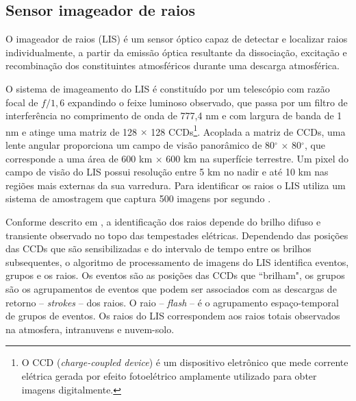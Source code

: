 \subsection{Sensor imageador de raios}

O imageador de raios (LIS) é um sensor óptico capaz de detectar e localizar raios individualmente, a partir da emissão óptica resultante da dissociação, excitação e recombinação dos constituintes atmosféricos durante uma descarga atmosférica. 

O sistema de imageamento do LIS é constituído por um telescópio com razão focal de $f/1,6$ expandindo o feixe luminoso observado, que passa por um filtro de interferência no comprimento de onda de 777,4 nm e com largura de banda de 1 nm e atinge uma matriz de 128 $\times$ 128 CCDs\footnote{O CCD (\textit{charge-coupled device}) é um dispositivo eletrônico que mede corrente elétrica gerada por efeito fotoelétrico amplamente utilizado para obter imagens digitalmente.}. Acoplada a matriz de CCDs, uma lente angular proporciona um campo de visão panorâmico de 80$^{\circ}$ $\times$ 80$^{\circ}$, que corresponde a uma área de 600 km $\times$ 600 km na superfície terrestre. Um pixel do campo de visão do LIS possui resolução entre 5 km no nadir e até 10 km nas regiões mais externas da sua varredura. Para identificar os raios o LIS utiliza um sistema de amostragem que captura 500 imagens por segundo \cite{christian2000LISalgorithm,boccippio1996science,trmmhandbook}. 


Conforme descrito em , a identificação dos raios depende do brilho difuso e transiente observado no topo das tempestades elétricas. Dependendo das posições das CCDs que são sensibilizadas e do intervalo de tempo entre os brilhos subsequentes, o algoritmo de processamento de imagens do LIS identifica  eventos, grupos e os raios. Os eventos são as posições das CCDs que ``brilham", os grupos são os agrupamentos de eventos que podem ser associados com as descargas de retorno -- \textit{strokes} -- dos raios. O raio -- \textit{flash} -- é o agrupamento espaço-temporal de grupos de eventos. Os raios do LIS correspondem aos raios totais observados na atmosfera, intranuvens e nuvem-solo.

